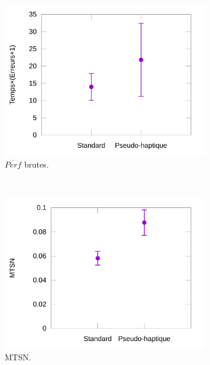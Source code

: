 \begin{figure}[htbp]
\begin{subfigure}[t]{0.49\textwidth}
			\includegraphics[width=\textwidth]{figures/ch5/phSpRawProducts}
			\caption{$\overline{Perf}$ brutes.}
			\label{fig:phSpRawProducts}
		\end{subfigure}
		~
		\begin{subfigure}[t]{0.49\textwidth}
			\centering
			\includegraphics[width=\textwidth]{figures/ch5/phSpNormTimes}
			\caption{MTSN.}
			\label{fig:phSpNormTimes}
		\end{subfigure}
				~
		\begin{subfigure}[t]{0.49\textwidth}
			\centering

\end{subfigure}
\end{figure}

